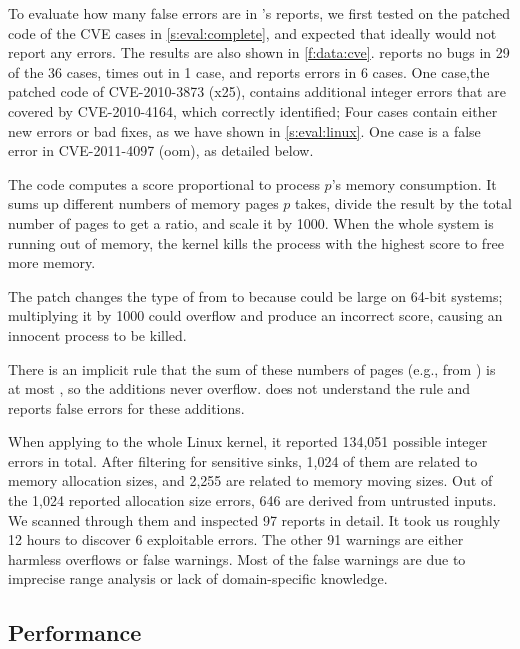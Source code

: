 To evaluate how many false errors are in \sys's reports,
we first tested \sys on the patched code of the CVE cases
in \autoref{s:eval:complete},
and expected that ideally \sys would not report any errors.
The results are also shown in \autoref{f:data:cve}.
\sys reports no bugs in 29 of the 36 cases, times out in 1 case, and
reports errors in 6 cases.
%
One case,the patched code of CVE-2010-3873 (x25),
contains additional integer errors that are covered by CVE-2010-4164,
which \sys correctly identified;
Four cases contain either new errors or bad fixes,
as we have shown in \autoref{s:eval:linux}.
One case is a false error in CVE-2011-4097 (oom), as detailed below.


The code
computes a score proportional to process $p$'s memory consumption.
It sums up different numbers of
memory pages $p$ takes, divide the result by the total number
of pages to get a ratio, and scale it by 1000.
When the whole system is running out of memory,
the kernel kills the process with the highest score
to free more memory.

The patch changes the type of  from  to  because
 could be large on 64-bit systems; multiplying it by
1000 could overflow and produce an incorrect score,
causing an innocent process to be killed.

There is an implicit rule that the sum of these numbers of pages
(e.g., from ) is at most , so the
additions never overflow.  \sys does not understand the rule and
reports false errors for these additions.

When applying \sys to the whole Linux kernel, it reported 134,051 possible
integer errors in total. After filtering for sensitive sinks, 1,024 of them are
related to memory allocation sizes, and 2,255 are related to memory moving
sizes.  Out of the 1,024 reported allocation size errors, 646 are derived from
untrusted inputs.  We scanned through them and inspected 97 reports in detail.
It took us roughly 12 hours to discover 6 exploitable errors.
The other 91 warnings are either harmless overflows or false warnings.  Most of
the false warnings are due to imprecise range analysis or lack of
domain-specific knowledge.


\subsection{Performance}
\label{s:eval:perf}

